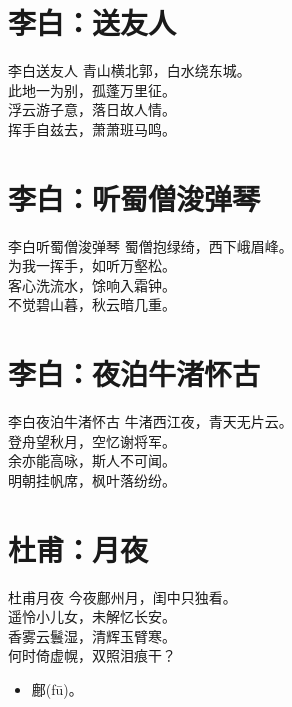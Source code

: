 \documentclass[12pt,oneside,a5paper]{book}
\begin{document}
\chapter{李白：送友人}
\begin{poemzh}{李白}{送友人}
青山横北郭，白水绕东城。\\
此地一为别，孤蓬万里征。\\
浮云游子意，落日故人情。\\
挥手自兹去，萧萧班马鸣。\\ 
\end{poemzh}

\chapter{李白：听蜀僧浚弹琴}
\begin{poemzh}{李白}{听蜀僧浚弹琴}
蜀僧抱绿绮，西下峨眉峰。\\
为我一挥手，如听万壑松。\\
客心洗流水，馀响入霜钟。\\
不觉碧山暮，秋云暗几重。\\ 
\end{poemzh}

\chapter{李白：夜泊牛渚怀古}
\begin{poemzh}{李白}{夜泊牛渚怀古}
牛渚西江夜，青天无片云。\\
登舟望秋月，空忆谢将军。\\
余亦能高咏，斯人不可闻。\\
明朝挂帆席，枫叶落纷纷。\\ 
\end{poemzh}

\chapter{杜甫：月夜}
\begin{poemzh}{杜甫}{月夜}
今夜鄜州月，闺中只独看。\\
遥怜小儿女，未解忆长安。\\
香雾云鬟湿，清辉玉臂寒。\\
何时倚虚幌，双照泪痕干？\\ 
\end{poemzh}

\begin{itemize}
\item 鄜(fū)。
\end{itemize}
\end{document}
